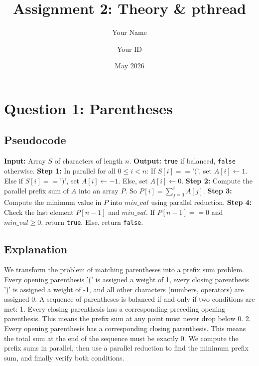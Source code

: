 \documentclass{article}
\title{Assignment 2: Theory \& pthread}
\author{Your Name \and Your ID}
\date{May 2026}
\begin{document}
\maketitle

\section{Question 1: Parentheses}

\subsection{Pseudocode}
\begin{algorithm}
\caption{Check Balanced Parentheses in Parallel}
\begin{algorithmic}[1]
\State \textbf{Input:} Array $S$ of characters of length $n$.
\State \textbf{Output:} \texttt{true} if balanced, \texttt{false} otherwise.
\State \textbf{Step 1:} In parallel for all $0 \le i < n$:
\State \quad If $S[i] == \text{'('}$, set $A[i] \gets 1$.
\State \quad Else if $S[i] == \text{')'}$, set $A[i] \gets -1$.
\State \quad Else, set $A[i] \gets 0$.
\State \textbf{Step 2:} Compute the parallel prefix sum of $A$ into an array $P$. 
\State \quad So $P[i] = \sum_{j=0}^i A[j]$.
\State \textbf{Step 3:} Compute the minimum value in $P$ into $min\_val$ using parallel reduction.
\State \textbf{Step 4:} Check the last element $P[n-1]$ and $min\_val$.
\State \quad If $P[n-1] == 0$ and $min\_val \ge 0$, return \texttt{true}.
\State \quad Else, return \texttt{false}.
\end{algorithmic}
\end{algorithm}

\subsection{Explanation}
We transform the problem of matching parentheses into a prefix sum problem. Every opening parenthesis '(' is assigned a weight of 1, every closing parenthesis ')' is assigned a weight of -1, and all other characters (numbers, operators) are assigned 0. A sequence of parentheses is balanced if and only if two conditions are met:
1. Every closing parenthesis has a corresponding preceding opening parenthesis. This means the prefix sum at any point must never drop below 0.
2. Every opening parenthesis has a corresponding closing parenthesis. This means the total sum at the end of the sequence must be exactly 0.
We compute the prefix sums in parallel, then use a parallel reduction to find the minimum prefix sum, and finally verify both conditions.
\end{document}
